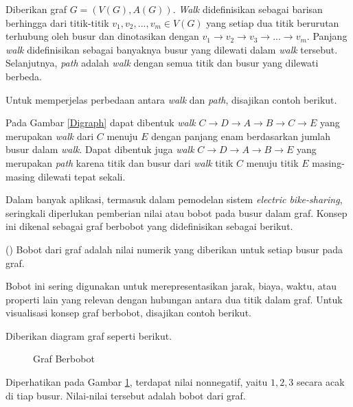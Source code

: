 \begin{definisi}
     Diberikan graf $G=(V(G),A(G))$. \textit{Walk} didefinisikan sebagai barisan berhingga dari titik-titik $v_1, v_2, ..., v_m \in V(G)$ yang setiap dua titik berurutan terhubung oleh busur dan dinotasikan dengan $v_1 \rightarrow v_2 \rightarrow v_3 \rightarrow ... \rightarrow v_m$. Panjang \textit{walk} didefinisikan sebagai banyaknya busur yang dilewati dalam \textit{walk} tersebut. Selanjutnya, \textit{path} adalah \textit{walk} dengan semua titik dan busur yang dilewati berbeda. 
\end{definisi}

Untuk memperjelas perbedaan antara \textit{walk} dan \textit{path}, disajikan contoh berikut.
\begin{contoh}
    Pada Gambar \ref{Digraph} dapat dibentuk \textit{walk} $C\rightarrow D \rightarrow A \rightarrow B \rightarrow C \rightarrow E$ yang merupakan \textit{walk} dari $C$ menuju $E$ dengan panjang enam berdasarkan jumlah busur dalam \textit{walk}. Dapat dibentuk juga \textit{walk} $C \rightarrow D \rightarrow A \rightarrow B \rightarrow E$ yang merupakan \textit{path} karena titik dan busur dari \textit{walk} titik $C$ menuju titik $E$ masing-masing dilewati tepat sekali.
\end{contoh}

Dalam banyak aplikasi, termasuk dalam pemodelan sistem \textit{electric bike-sharing}, seringkali diperlukan pemberian nilai atau bobot pada busur dalam graf. Konsep ini dikenal sebagai graf berbobot yang didefinisikan sebagai berikut.
\begin{definisi}
    () Bobot dari graf adalah nilai numerik yang diberikan untuk setiap busur pada graf. 
\end{definisi}

Bobot ini sering digunakan untuk merepresentasikan jarak, biaya, waktu, atau properti lain yang relevan dengan hubungan antara dua titik dalam graf. Untuk visualisasi konsep graf berbobot, disajikan contoh berikut.
\begin{contoh}
    Diberikan diagram graf seperti berikut.\\
    \begin{figure}[H]
        \centering
        \caption{Graf Berbobot}
        \label{Graf sederhana}
    \end{figure}

    Diperhatikan pada Gambar \ref{Graf sederhana}, terdapat nilai nonnegatif, yaitu $1,2,3$ secara acak di tiap busur. Nilai-nilai tersebut adalah bobot dari graf.
\end{contoh}

